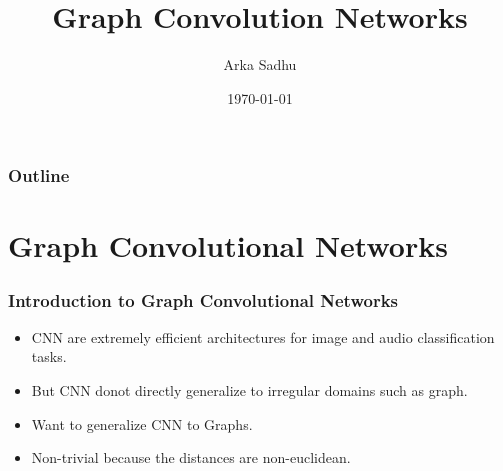 \documentclass{beamer}
\title{Graph Convolution Networks}
\author{Arka Sadhu}
\institute{IIT Bombay}
\date{\today}
\begin{document}


\begin{frame}
\titlepage
\end{frame}

\begin{frame}
\frametitle{Outline}
\tableofcontents
\end{frame}

\section{Graph Convolutional Networks}

\begin{frame}
  \frametitle{Introduction to Graph Convolutional Networks}
  \begin{itemize}
  \item <1-> CNN are extremely efficient architectures for image and audio classification tasks.
  \item <1-> But CNN donot directly generalize to irregular domains such as graph.
  \item <2-> Want to generalize CNN to Graphs.
  \item <3-> Non-trivial because the distances are non-euclidean.
  \end{itemize}
\end{frame}
\end{document}
